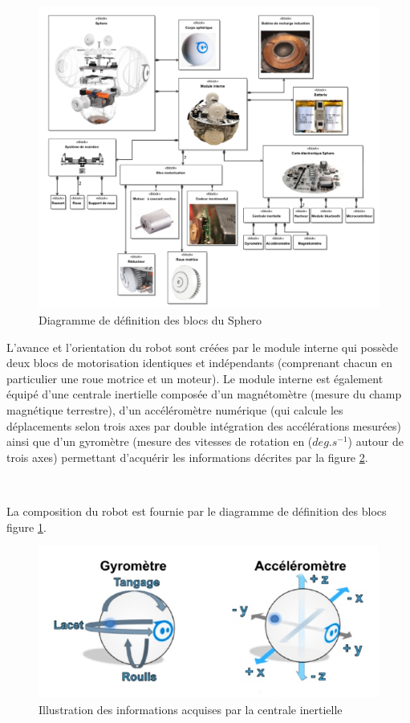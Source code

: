 \begin{figure}[!ht]\begin{center}
 \includegraphics[width=0.85\linewidth]{img/figure_8}
 \caption{Diagramme de définition des blocs du Sphero}
 \label{fig8}
\end{center}\end{figure}

L'avance et l'orientation du robot sont créées par le module interne qui possède deux blocs de motorisation identiques et indépendants (comprenant chacun en particulier une roue motrice et un moteur). Le module interne est également équipé d'une centrale inertielle composée d'un magnétomètre (mesure du champ magnétique terrestre), d'un accéléromètre numérique (qui calcule les déplacements selon trois axes par double intégration des accélérations mesurées) ainsi que d'un gyromètre (mesure des vitesses de rotation en ($deg.s^{-1}$) autour de trois axes) permettant d'acquérir les informations décrites par la figure \ref{fig9}.


~\

La composition du robot est fournie par le diagramme de définition des blocs figure \ref{fig8}. 

\begin{figure}[!ht]\begin{center}
 \includegraphics[width=0.5\linewidth]{img/figure_9}
 \caption{Illustration des informations acquises par la centrale inertielle}
 \label{fig9}
\end{center}\end{figure}

